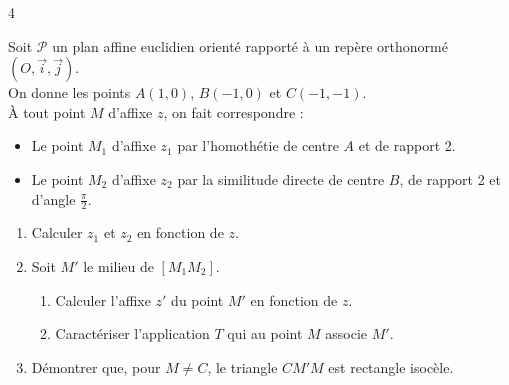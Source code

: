 \documentclass{axiobac}
\begin{document}
\entete

\begin{exercice}{4}

Soit $\mathcal{P}$ un plan affine euclidien orienté rapporté à un repère orthonormé $(O, \vec{i}, \vec{j})$. \\
On donne les points $A(1,0)$, $B(-1,0)$ et $C(-1,-1)$. \\
À tout point $M$ d'affixe $z$, on fait correspondre :
\begin{itemize}
    \item Le point $M_1$ d'affixe $z_1$ par l'homothétie de centre $A$ et de rapport 2.
    \item Le point $M_2$ d'affixe $z_2$ par la similitude directe de centre $B$, de rapport 2 et d'angle $\frac{\pi}{2}$.
\end{itemize}

\begin{enumerate}
    \item Calculer $z_1$ et $z_2$ en fonction de $z$.
    \item Soit $M'$ le milieu de $[M_1 M_2]$.
    \begin{enumerate}
        \item Calculer l'affixe $z'$ du point $M'$ en fonction de $z$.
        \item Caractériser l'application $T$ qui au point $M$ associe $M'$.
    \end{enumerate}
    \item Démontrer que, pour $M \neq C$, le triangle $CM'M$ est rectangle isocèle.
\end{enumerate}

\end{exercice}
\end{document}

